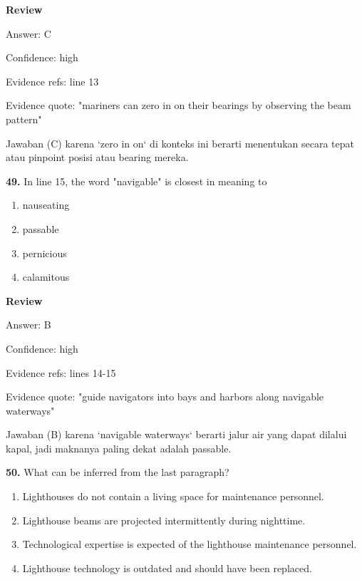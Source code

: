 \documentclass[12pt]{article}
\begin{document}
\par
\begingroup
\setlength{\parskip}{0pt}
\setlength{\parindent}{0pt}
\textbf{Review}\par
Answer: C\par
Confidence: high\par
Evidence refs: line 13\par
Evidence quote: "mariners can zero in on their bearings by observing the beam pattern"\par
Jawaban (C) karena `zero in on` di konteks ini berarti menentukan secara tepat atau pinpoint posisi atau bearing mereka.\par
\endgroup
\par
\vspace{0.25\baselineskip}
\noindent\textbf{49.} In line 15, the word "navigable" is closest in meaning to
\begin{enumerate}[label=(\Alph*),leftmargin=*,itemsep=0.2em]
\item nauseating
\item passable
\item pernicious
\item calamitous
\end{enumerate}
\par
\begingroup
\setlength{\parskip}{0pt}
\setlength{\parindent}{0pt}
\textbf{Review}\par
Answer: B\par
Confidence: high\par
Evidence refs: lines 14-15\par
Evidence quote: "guide navigators into bays and harbors along navigable waterways"\par
Jawaban (B) karena `navigable waterways` berarti jalur air yang dapat dilalui kapal, jadi maknanya paling dekat adalah passable.\par
\endgroup
\par
\vspace{0.25\baselineskip}
\noindent\textbf{50.} What can be inferred from the last paragraph?
\begin{enumerate}[label=(\Alph*),leftmargin=*,itemsep=0.2em]
\item Lighthouses do not contain a living space for maintenance personnel.
\item Lighthouse beams are projected intermittently during nighttime.
\item Technological expertise is expected of the lighthouse maintenance personnel.
\item Lighthouse technology is outdated and should have been replaced.
\end{enumerate}
\end{document}

